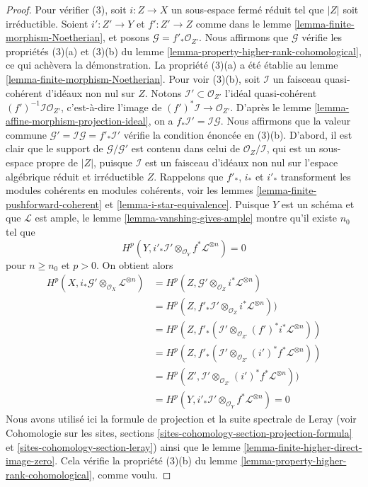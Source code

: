 \begin{proof}
\medskip\noindent
Pour vérifier (3), soit $i : Z \to X$ un sous-espace fermé réduit tel que $|Z|$
soit irréductible. Soient $i' : Z' \to Y$ et $f' : Z' \to Z$ comme dans le
lemme \ref{lemma-finite-morphism-Noetherian}, et posons
$\mathcal{G} = f'_*\mathcal{O}_{Z'}$. Nous affirmons que
$\mathcal{G}$ vérifie les propriétés (3)(a) et (3)(b) du
lemme \ref{lemma-property-higher-rank-cohomological},
ce qui achèvera la démonstration. La propriété (3)(a) a été établie au
lemme \ref{lemma-finite-morphism-Noetherian}. Pour voir (3)(b), soit
$\mathcal{I}$ un faisceau quasi-cohérent d'idéaux non nul sur $Z$.
Notons $\mathcal{I}' \subset \mathcal{O}_{Z'}$ l'idéal quasi-cohérent
$(f')^{-1}\mathcal{I} \mathcal{O}_{Z'}$, c'est-à-dire
l'image de $(f')^*\mathcal{I} \to \mathcal{O}_{Z'}$.
D'après le lemme \ref{lemma-affine-morphism-projection-ideal}, on a
$f_*\mathcal{I}' = \mathcal{I} \mathcal{G}$. Nous affirmons que la valeur commune
$\mathcal{G}' = \mathcal{I} \mathcal{G} = f'_*\mathcal{I}'$
vérifie la condition énoncée en (3)(b).
D'abord, il est clair que le support de $\mathcal{G}/\mathcal{G}'$
est contenu dans celui de $\mathcal{O}_Z/\mathcal{I}$,
qui est un sous-espace propre de $|Z|$, puisque $\mathcal{I}$ est un
faisceau d'idéaux non nul sur l'espace algébrique réduit et irréductible $Z$.
Rappelons que $f'_*$, $i_*$ et $i'_*$ transforment les modules cohérents en
modules cohérents, voir les lemmes \ref{lemma-finite-pushforward-coherent} et
\ref{lemma-i-star-equivalence}.
Puisque $Y$ est un schéma et que $\mathcal{L}$ est ample,
le lemme \ref{lemma-vanshing-gives-ample} montre
qu'il existe $n_0$ tel que
$$
H^p(Y, i'_*\mathcal{I}' \otimes_{\mathcal{O}_Y} f^*\mathcal{L}^{\otimes n}) = 0
$$
pour $n \geq n_0$ et $p > 0$. On obtient alors
\begin{align*}
H^p(X, i_*\mathcal{G}' \otimes_{\mathcal{O}_X} \mathcal{L}^{\otimes n})
& =
H^p(Z, \mathcal{G'} \otimes_{\mathcal{O}_Z} i^*\mathcal{L}^{\otimes n}) \\
& =
H^p(Z,
f'_*\mathcal{I}' \otimes_{\mathcal{O}_Z} i^*\mathcal{L}^{\otimes n})) \\
& =
H^p(Z, f'_*(\mathcal{I}' \otimes_{\mathcal{O}_{Z'}}
(f')^*i^*\mathcal{L}^{\otimes n})) \\
& =
H^p(Z, f'_*(\mathcal{I}' \otimes_{\mathcal{O}_{Z'}}
(i')^*f^*\mathcal{L}^{\otimes n})) \\
& =
H^p(Z',
\mathcal{I}' \otimes_{\mathcal{O}_{Z'}} (i')^*f^*\mathcal{L}^{\otimes n})) \\
& =
H^p(Y, i'_*\mathcal{I}' \otimes_{\mathcal{O}_Y} f^*\mathcal{L}^{\otimes n}) = 0
\end{align*}
Nous avons utilisé ici la formule de projection et la suite spectrale de Leray
(voir Cohomologie sur les sites, sections
\ref{sites-cohomology-section-projection-formula} et
\ref{sites-cohomology-section-leray})
ainsi que le lemme \ref{lemma-finite-higher-direct-image-zero}.
Cela vérifie la propriété (3)(b) du
lemme \ref{lemma-property-higher-rank-cohomological}, comme voulu.
\end{proof}










